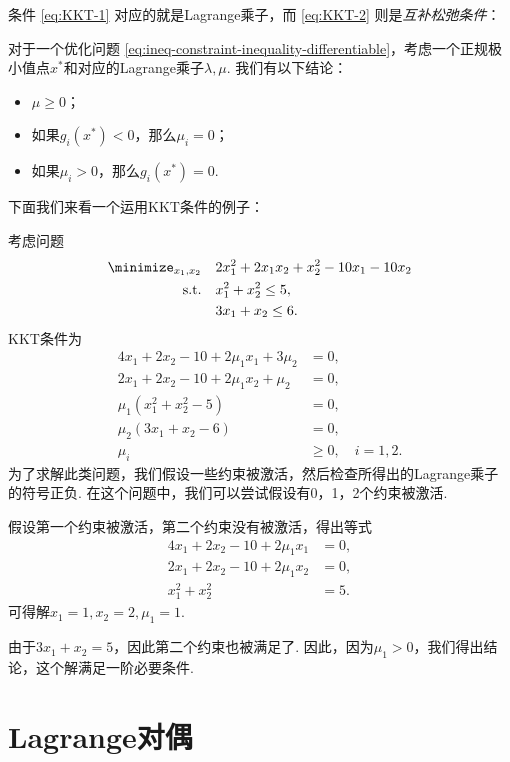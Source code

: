 条件 \eqref{eq:KKT-1} 对应的就是Lagrange乘子，而 \eqref{eq:KKT-2} 则是\emph{互补松弛条件}：

\begin{proposition}[互补松弛条件]
    对于一个优化问题 \eqref{eq:ineq-constraint-inequality-differentiable}，考虑一个正规极小值点$x^*$和对应的Lagrange乘子$\lambda,\mu$. 我们有以下结论：
    \begin{itemize}
        \item $\mu\geq 0$；
        \item 如果$g_i(x^*)<0$，那么$\mu_i=0$；
        \item 如果$\mu_i>0$，那么$g_i(x^*)=0$.
    \end{itemize}
\end{proposition}

下面我们来看一个运用KKT条件的例子：
\begin{example}
考虑问题
\begin{align*}
    \minimize_{x_1,x_2} \quad &2x_1^2+2x_1x_2+x_2^2-10x_1-10x_2 \\
    \text{s.t.}\quad &x_1^2+x_2^2\leq 5, \\
    & 3x_1+x_2\leq 6.
\end{align*}
KKT条件为
\begin{align*}
    4x_1+2x_2-10+2\mu_1x_1+3\mu_2&=0, \\
    2x_1+2x_2-10+2\mu_1x_2+\mu_2&=0, \\
    \mu_1(x_1^2+x_2^2-5)&=0, \\
    \mu_2(3x_1+x_2-6)&=0,\\
    \mu_i&\geq 0,\quad i=1,2.
\end{align*}
为了求解此类问题，我们假设一些约束被激活，然后检查所得出的Lagrange乘子的符号正负. 在这个问题中，我们可以尝试假设有0，1，2个约束被激活. 

假设第一个约束被激活，第二个约束没有被激活，得出等式
\begin{align*}
4x_1+2x_2-10+2\mu_1x_1&=0, \\
2x_1+2x_2-10+2\mu_1x_2&=0, \\
x_1^2+x_2^2&=5.
\end{align*}
可得解$x_1=1,x_2=2,\mu_1=1.$

由于$3x_1+x_2=5$，因此第二个约束也被满足了. 因此，因为$\mu_1 > 0$，我们得出结论，这个解满足一阶必要条件. 
\end{example}

\section{Lagrange对偶}

